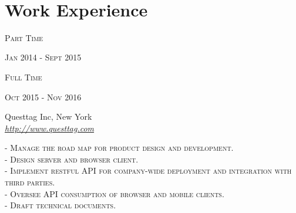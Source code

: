 \documentclass[10pt]{article} %
\begin{document}
\color{text1} %


\par{\\ %



\begin{minipage}[t]{0.5\textwidth} %
\vspace{0pt} %
	

\section{Work Experience} 

{\raggedleft\textsc{Part Time}}
{\raggedleft\textsc{Jan 2014 - Sept 2015}\par}
{\raggedleft\textsc{Full Time}}
{\raggedleft\textsc{Oct 2015 - Nov 2016}\par}
{\raggedright\large Questtag Inc, New York\\
\textit{\href {http://www.questtag.com}{http://www.questtag.com}}\\[5pt]}

\textsc{- Manage the road map for product design and development.}\\
\textsc{- Design server and browser client.}\\
\textsc{- Implement restful API for company-wide deployment and integration with third parties.}\\
\textsc{- Oversee API consumption of browser and mobile clients.}\\
\textsc{- Draft technical documents.}\\




\end{minipage}}
\end{document}
